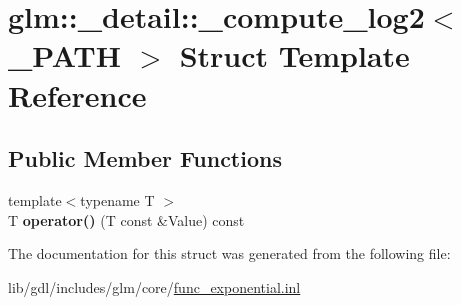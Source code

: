 \hypertarget{structglm_1_1__detail_1_1__compute__log2}{}\section{glm\+:\+:\+\_\+detail\+:\+:\+\_\+compute\+\_\+log2$<$ \+\_\+\+P\+A\+T\+H $>$ Struct Template Reference}
\label{structglm_1_1__detail_1_1__compute__log2}
\subsection*{Public Member Functions}
\begin{DoxyCompactItemize}
\item 
\hypertarget{structglm_1_1__detail_1_1__compute__log2_aca7f23dcf7f951497006e6b6de4a77a4}{}{\footnotesize template$<$typename T $>$ }\\T {\bfseries operator()} (T const \&Value) const \label{structglm_1_1__detail_1_1__compute__log2_aca7f23dcf7f951497006e6b6de4a77a4}

\end{DoxyCompactItemize}


The documentation for this struct was generated from the following file\+:\begin{DoxyCompactItemize}
\item 
lib/gdl/includes/glm/core/\hyperlink{func__exponential_8inl}{func\+\_\+exponential.\+inl}\end{DoxyCompactItemize}
